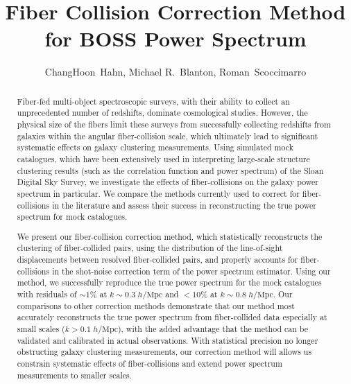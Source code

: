 \documentclass{emulateapj}
\begin{document}
\title{Fiber Collision Correction Method for BOSS Power Spectrum} 

\author{ChangHoon~Hahn, 
Michael R.~Blanton, 
Roman~Scoccimarro} 

\begin{abstract}
Fiber-fed multi-object spectroscopic surveys, with their ability to collect an unprecedented number of redshifts, dominate cosmological studies. However, the physical size of the fibers limit these surveys from successfully collecting redshifts from galaxies within the angular fiber-collision scale, which ultimately lead to significant systematic effects on galaxy clustering measurements. Using simulated mock catalogues, which have been extensively used in interpreting large-scale structure clustering results (such as the correlation function and power spectrum) of the Sloan Digital Sky Survey, we investigate the effects of fiber-collisions on the galaxy power spectrum in particular. We compare the methods currently used to correct for fiber-collisions in the literature and assess their success in reconstructing the true power spectrum for mock catalogues. 

We present our fiber-collision correction method, which statistically reconstructs the clustering of fiber-collided pairs, using the distribution of the line-of-sight displacements between resolved fiber-collided pairs, and properly accounts for fiber-collisions in the shot-noise correction term of the power spectrum estimator. Using our method, we successfully reproduce the true power spectrum for the mock catalogues with residuals of $\sim 1\%$ at $k \sim 0.3 \; h/\mathrm{Mpc}$ and $< 10\%$ at $k \sim 0.8 \; h/\mathrm{Mpc}$. Our comparisons to other correction methods demonstrate that our method most accurately reconstructs the true power spectrum from fiber-collided data especially at small scales ($k > 0.1\; h/\mathrm{Mpc}$), with the added advantage that the method can be validated and calibrated in actual observations. With statistical precision no longer obstructing galaxy clustering measurements, our correction method will allows us constrain systematic effects of fiber-collisions and extend power spectrum measurements to smaller scales. 
\end{abstract}
\end{document}
